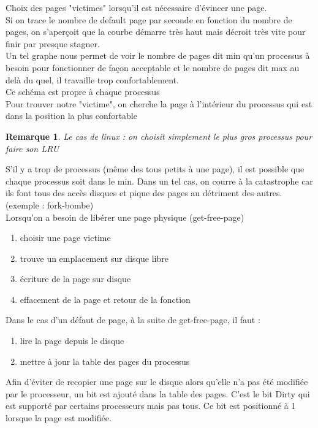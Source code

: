 \documentclass[12pt,a4paper]{report}
\newtheorem*{rem}{Remarque}
\begin{document}
Choix des pages "victimes" lorsqu'il est nécessaire d'évincer une page.\\
Si on trace le nombre de default page par seconde en fonction du nombre de pages, on s'aperçoit que la courbe démarre très haut mais décroit très vite pour finir par presque stagner.\\
Un tel graphe nous permet de voir le nombre de pages dit min qu'un processus à besoin pour fonctionner de façon acceptable et le nombre de pages dit max au delà du quel, il travaille trop confortablement.\\
Ce schéma est propre à chaque processus\\
Pour trouver notre "victime", on cherche la page à l'intérieur du processus qui est dans la position la plus confortable\\
\begin{rem}
Le cas de linux : on choisit simplement le plus gros processus pour faire son LRU \end{rem}

S'il y a trop de processus (même des tous petits à une page), il est possible que chaque processus soit dans le min. Dans un tel cas, on courre à la catastrophe car ils font tous des accès disques et pique des pages au détriment des autres. (exemple : fork-bombe)\\

Lorsqu'on a besoin de libérer une page physique (get-free-page)
\begin{enumerate}
\item choisir une page victime
\item trouve un emplacement sur disque libre
\item écriture de la page sur disque
\item effacement de la page et retour de la fonction\\
\end{enumerate}

Dans le cas d'un défaut de page, à la suite de get-free-page, il faut :
\begin{enumerate}
\item lire la page depuis le disque
\item mettre à jour la table des pages du processus\\
\end{enumerate}

Afin d'éviter de recopier une page sur le disque alors qu'elle n'a pas été modifiée par le processeur, un bit est ajouté dans la table des pages. C'est le bit Dirty qui est supporté par certains processeurs mais pas tous. Ce bit est positionné à 1 lorsque la page est modifiée.\\
\end{document}
